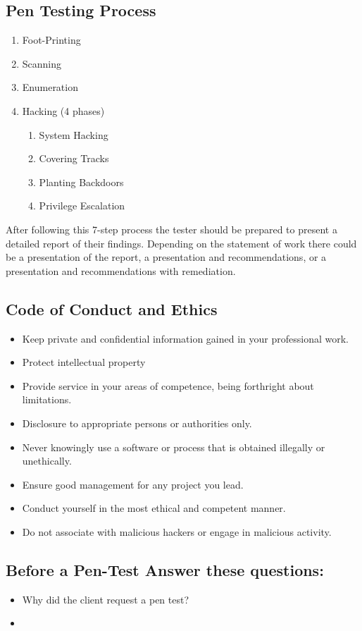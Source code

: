 \subsection{Pen Testing Process}
\begin{enumerate}
    \item Foot-Printing
    \item Scanning
    \item Enumeration
    \item Hacking (4 phases)
    \begin{enumerate}
        \item System Hacking
        \item Covering Tracks
        \item Planting Backdoors
        \item Privilege Escalation
    \end{enumerate}
\end{enumerate}
After following this 7-step process the tester should be prepared to present a detailed report of their findings.
Depending on the statement of work there could be a presentation of the report, a presentation and recommendations, or a presentation and recommendations with remediation.

\subsection{Code of Conduct and Ethics}
\begin{itemize}
    \item Keep private and confidential information gained in your professional work.
    \item Protect intellectual property
    \item Provide service in your areas of competence, being forthright about limitations.
    \item Disclosure to appropriate persons or authorities only.
    \item Never knowingly use a software or process that is obtained illegally or unethically.
    \item Ensure good management for any project you lead.
    \item Conduct yourself in the most ethical and competent manner.
    \item Do not associate with malicious hackers or engage in malicious activity.
\end{itemize}

\subsection{Before a Pen-Test Answer these questions:}
\begin{itemize}
    \item Why did the client request a pen test?
    \item 
\end{itemize}